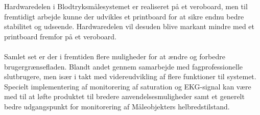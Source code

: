 Hardwaredelen i Blodtryksmålesystemet er realiseret på et veroboard, men til fremtidigt arbejde kunne der udvikles et printboard for at sikre endnu bedre stabilitet og udseende. Hardwaredelen vil desuden blive markant mindre med et printboard fremfor på et veroboard. \\ \\
Samlet set er der i fremtiden flere muligheder for at ændre og forbedre brugergrænsefladen. Blandt andet gennem samarbejde med fagprofessionelle slutbrugere, men især i takt med videreudvikling af flere funktioner til systemet. \\
Specielt implementering af monitorering af saturation og EKG-signal kan være med til at løfte produktet til bredere anvendelsesmuligheder samt et generelt bedre udgangspunkt for monitorering af Måleobjekters helbredstilstand.


